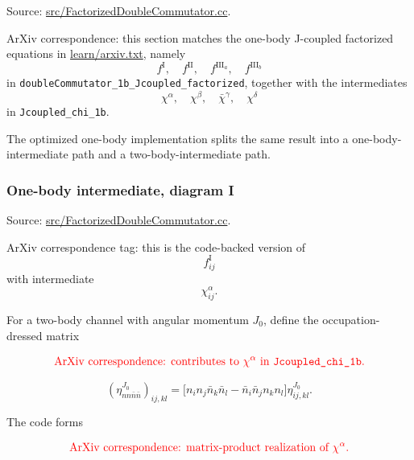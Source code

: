 \documentclass[
]{article}
\begin{document}
Source:
\href{../src/FactorizedDoubleCommutator.cc\#L55-L801}{src/FactorizedDoubleCommutator.cc}.

ArXiv correspondence: this section matches the one-body J-coupled
factorized equations in \href{./arxiv.txt}{learn/arxiv.txt}, namely \begin{equation}
f^{\mathrm{I}},\quad f^{\mathrm{II}},\quad f^{\mathrm{III}_a},\quad f^{\mathrm{III}_b}
\end{equation} in \texttt{doubleCommutator\_1b\_Jcoupled\_factorized}, together with
the intermediates \begin{equation}
\chi^{\alpha},\quad \chi^{\beta},\quad \bar\chi^{\gamma},\quad \chi^{\delta}
\end{equation} in \texttt{Jcoupled\_chi\_1b}.

The optimized one-body implementation splits the same result into a
one-body-intermediate path and a two-body-intermediate path.

\subsubsection{One-body intermediate, diagram
I}\label{one-body-intermediate-diagram-i}

Source:
\href{../src/FactorizedDoubleCommutator.cc\#L99-L249}{src/FactorizedDoubleCommutator.cc}.

ArXiv correspondence tag: this is the code-backed version of \begin{equation}
f^{\mathrm{I}}_{ij}
\end{equation} with intermediate \begin{equation}
\chi^{\alpha}_{ij}.
\end{equation}

For a two-body channel with angular momentum \(J_0\), define the
occupation-dressed matrix

\begin{equation}
{\color{red}\text{ArXiv correspondence: contributes to }\chi^{\alpha}\text{ in }\texttt{Jcoupled\_chi\_1b}.}
\end{equation}

\begin{equation}
\left(\eta_{nn\bar n\bar n}^{J_0}\right)_{ij,kl}
=\Big[n_i n_j\bar n_k\bar n_l-\bar n_i\bar n_j n_k n_l\Big] \eta^{J_0}_{ij,kl} .
\end{equation}

The code forms

\begin{equation}
{\color{red}\text{ArXiv correspondence: matrix-product realization of }\chi^{\alpha}.}
\end{equation}
\end{document}
